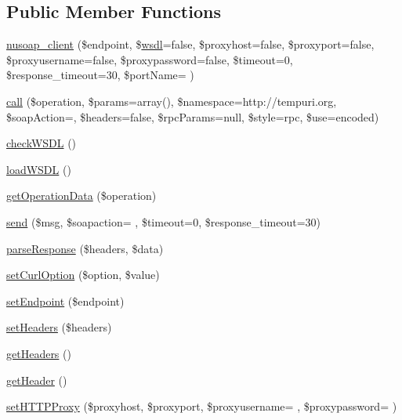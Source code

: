 \subsection*{Public Member Functions}
\begin{DoxyCompactItemize}
\item 
\hyperlink{classnusoap__client_ae2c5b2115e9315e43f0368d1b13f44c3}{nusoap\+\_\+client} (\$endpoint, \$\hyperlink{classwsdl}{wsdl}=false, \$proxyhost=false, \$proxyport=false, \$proxyusername=false, \$proxypassword=false, \$timeout=0, \$response\+\_\+timeout=30, \$port\+Name= \textquotesingle{}\textquotesingle{})
\item 
\hyperlink{classnusoap__client_a806d1d83f45454caf9c6c361c0a4b0ad}{call} (\$operation, \$params=array(), \$namespace=\textquotesingle{}http\+://tempuri.\+org\textquotesingle{}, \$soap\+Action=\textquotesingle{}\textquotesingle{}, \$headers=false, \$rpc\+Params=null, \$style=\textquotesingle{}rpc\textquotesingle{}, \$use=\textquotesingle{}encoded\textquotesingle{})
\item 
\hyperlink{classnusoap__client_a87e102c284606feef544e3633de91d42}{check\+W\+S\+D\+L} ()
\item 
\hyperlink{classnusoap__client_a1286e71c7b97874e11b2b0caf7694e8a}{load\+W\+S\+D\+L} ()
\item 
\hyperlink{classnusoap__client_ad66fb2de1dae9b9597bed83de4f343a7}{get\+Operation\+Data} (\$operation)
\item 
\hyperlink{classnusoap__client_aece60a5a6bd359481071516aa7024b56}{send} (\$msg, \$soapaction= \textquotesingle{}\textquotesingle{}, \$timeout=0, \$response\+\_\+timeout=30)
\item 
\hyperlink{classnusoap__client_aca1ed2155629bfc242ddea3636ac24c1}{parse\+Response} (\$headers, \$data)
\item 
\hyperlink{classnusoap__client_a314f6d38ace6f3d92d0d1d7e8cfc0aaf}{set\+Curl\+Option} (\$option, \$value)
\item 
\hyperlink{classnusoap__client_abab265adeddb116a65a24dc0fa1eafb2}{set\+Endpoint} (\$endpoint)
\item 
\hyperlink{classnusoap__client_ac1f59fefc1b33175a734321e13b42253}{set\+Headers} (\$headers)
\item 
\hyperlink{classnusoap__client_a157e0005d82edaa21cbea07fdc5c62da}{get\+Headers} ()
\item 
\hyperlink{classnusoap__client_a614834f1605e407376028e8c82298c82}{get\+Header} ()
\item 
\hyperlink{classnusoap__client_a52152e7ae9c46863424bbafacf6a7f71}{set\+H\+T\+T\+P\+Proxy} (\$proxyhost, \$proxyport, \$proxyusername= \textquotesingle{}\textquotesingle{}, \$proxypassword= \textquotesingle{}\textquotesingle{})

\end{DoxyCompactItemize}
